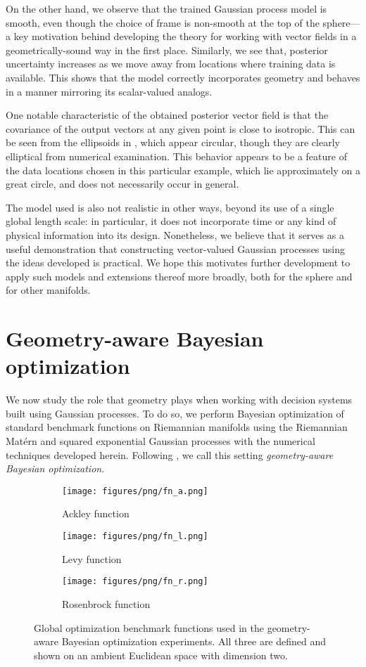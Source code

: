 \documentclass[11pt]{book}
\begin{document}
On the other hand, we observe that the trained Gaussian process model is smooth, even though the choice of frame is non-smooth at the top of the sphere---a key motivation behind developing the theory for working with vector fields in a geometrically-sound way in the first place.
Similarly, we see that, posterior uncertainty increases as we move away from locations where training data is available.
This shows that the model correctly incorporates geometry and behaves in a manner mirroring its scalar-valued analogs.

One notable characteristic of the obtained posterior vector field is that the covariance of the output vectors at any given point is close to isotropic.
This can be seen from the ellipsoids in , which appear circular, though they are clearly elliptical from numerical examination.
This behavior appears to be a feature of the data locations chosen in this particular example, which lie approximately on a great circle, and does not necessarily occur in general.

The model used is also not realistic in other ways, beyond its use of a single global length scale: in particular, it does not incorporate time or any kind of physical information into its design.
Nonetheless, we believe that it serves as a useful demonstration that constructing vector-valued Gaussian processes using the ideas developed is practical.
We hope this motivates further development to apply such models and extensions thereof more broadly, both for the sphere and for other manifolds.

\section{Geometry-aware Bayesian optimization}

We now study the role that geometry plays when working with decision systems built using Gaussian processes.
To do so, we perform Bayesian optimization of standard benchmark functions on Riemannian manifolds using the Riemannian Matérn and squared exponential Gaussian processes with the numerical techniques developed herein.
Following \textcite{jaquier20}, we call this setting \emph{geometry-aware Bayesian optimization}.

\begin{figure}
\begin{subfigure}{0.32\textwidth}
\texttt{[image: figures/png/fn\_a.png]}
\caption{Ackley function}
\end{subfigure}
\begin{subfigure}{0.32\textwidth}
\texttt{[image: figures/png/fn\_l.png]}
\caption{Levy function}
\end{subfigure}
\begin{subfigure}{0.32\textwidth}
\texttt{[image: figures/png/fn\_r.png]}
\caption{Rosenbrock function}
\end{subfigure}
\caption[Global optimization benchmark functions]{Global optimization benchmark functions used in the geometry-aware Bayesian optimization experiments. All three are defined and shown on an ambient Euclidean space with dimension two.}
\label{fig:benchmark-functions}
\end{figure}
\end{document}
